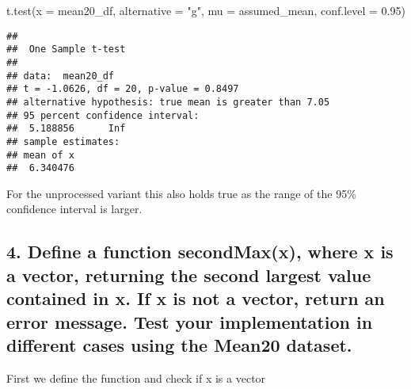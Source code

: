 \documentclass[
]{article}
\newenvironment{Shaded}{\begin{snugshade}}{\end{snugshade}}
\newcommand{\AttributeTok}[1]{\textcolor[rgb]{0.77,0.63,0.00}{#1}}
\newcommand{\FloatTok}[1]{\textcolor[rgb]{0.00,0.00,0.81}{#1}}
\newcommand{\FunctionTok}[1]{\textcolor[rgb]{0.00,0.00,0.00}{#1}}
\newcommand{\NormalTok}[1]{#1}
\newcommand{\StringTok}[1]{\textcolor[rgb]{0.31,0.60,0.02}{#1}}
\begin{document}
\begin{Shaded}
\begin{Highlighting}[]
\FunctionTok{t.test}\NormalTok{(}\AttributeTok{x =}\NormalTok{ mean20\_df, }\AttributeTok{alternative =} \StringTok{"g"}\NormalTok{, }\AttributeTok{mu =}\NormalTok{ assumed\_mean, }\AttributeTok{conf.level =} \FloatTok{0.95}\NormalTok{)}
\end{Highlighting}
\end{Shaded}

\begin{verbatim}
## 
##  One Sample t-test
## 
## data:  mean20_df
## t = -1.0626, df = 20, p-value = 0.8497
## alternative hypothesis: true mean is greater than 7.05
## 95 percent confidence interval:
##  5.188856      Inf
## sample estimates:
## mean of x 
##  6.340476
\end{verbatim}

For the unprocessed variant this also holds true as the range of the
95\% confidence interval is larger.

\newpage

\hypertarget{define-a-function-secondmaxx-where-x-is-a-vector-returning-the-second-largest-value-contained-in-x.-if-x-is-not-a-vector-return-an-error-message.-test-your-implementation-in-different-cases-using-the-mean20-dataset.}{%
\subsection{4. Define a function secondMax(x), where x is a vector,
returning the second largest value contained in x. If x is not a vector,
return an error message. Test your implementation in different cases
using the Mean20
dataset.}\label{define-a-function-secondmaxx-where-x-is-a-vector-returning-the-second-largest-value-contained-in-x.-if-x-is-not-a-vector-return-an-error-message.-test-your-implementation-in-different-cases-using-the-mean20-dataset.}}

First we define the function and check if x is a vector
\end{document}
